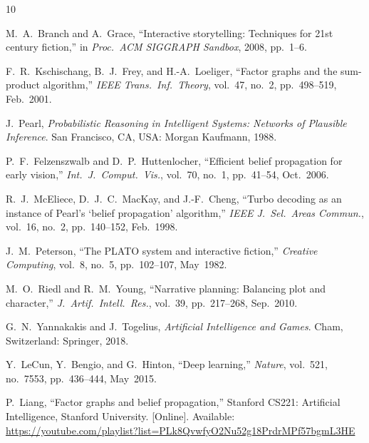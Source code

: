 \documentclass[journal]{IEEEtran}
\begin{document}
\begin{thebibliography}{10}

M.~A.~Branch and A.~Grace, ``Interactive storytelling: Techniques for 21st century fiction,'' in \textit{Proc.\ ACM SIGGRAPH Sandbox}, 2008, pp.~1--6.

F.~R.~Kschischang, B.~J.~Frey, and H.-A.~Loeliger, ``Factor graphs and the sum-product algorithm,'' \textit{IEEE Trans.\ Inf.\ Theory}, vol.~47, no.~2, pp.~498--519, Feb.~2001.

J.~Pearl, \textit{Probabilistic Reasoning in Intelligent Systems: Networks of Plausible Inference}. San Francisco, CA, USA: Morgan Kaufmann, 1988.

P.~F.~Felzenszwalb and D.~P.~Huttenlocher, ``Efficient belief propagation for early vision,'' \textit{Int.\ J.\ Comput.\ Vis.}, vol.~70, no.~1, pp.~41--54, Oct.~2006.

R.~J.~McEliece, D.~J.~C.~MacKay, and J.-F.~Cheng, ``Turbo decoding as an instance of Pearl's `belief propagation' algorithm,'' \textit{IEEE J.\ Sel.\ Areas Commun.}, vol.~16, no.~2, pp.~140--152, Feb.~1998.

J.~M.~Peterson, ``The PLATO system and interactive fiction,'' \textit{Creative Computing}, vol.~8, no.~5, pp.~102--107, May~1982.

M.~O.~Riedl and R.~M.~Young, ``Narrative planning: Balancing plot and character,'' \textit{J.\ Artif.\ Intell.\ Res.}, vol.~39, pp.~217--268, Sep.~2010.

G.~N.~Yannakakis and J.~Togelius, \textit{Artificial Intelligence and Games}. Cham, Switzerland: Springer, 2018.

Y.~LeCun, Y.~Bengio, and G.~Hinton, ``Deep learning,'' \textit{Nature}, vol.~521, no.~7553, pp.~436--444, May~2015.

P.~Liang, ``Factor graphs and belief propagation,'' Stanford CS221: Artificial Intelligence, Stanford University. [Online]. Available: \url{https://youtube.com/playlist?list=PLk8QvwfyO2Nu52g18PrdrMPf57bgmL3HE}

\end{thebibliography}
\end{document}
